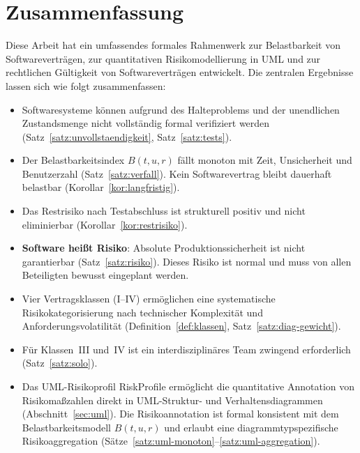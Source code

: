 ﻿\documentclass[a4paper,12pt]{article}
\theoremstyle{definition}
\begin{document}
\section{Zusammenfassung}

Diese Arbeit hat ein umfassendes formales Rahmenwerk zur Belastbarkeit von
Softwarevertr\"agen, zur quantitativen Risikomodellierung in UML und zur
rechtlichen G\"ultigkeit von Softwarevertr\"agen entwickelt. Die zentralen
Ergebnisse lassen sich wie folgt zusammenfassen:

\begin{itemize}
    \item Softwaresysteme k\"onnen aufgrund des Halteproblems und der unendlichen
          Zustandsmenge nicht vollst\"andig formal verifiziert werden
          (Satz~\ref{satz:unvollstaendigkeit}, Satz~\ref{satz:tests}).

    \item Der Belastbarkeitsindex $B(t,u,r)$ f\"allt monoton mit Zeit, Unsicherheit
          und Benutzerzahl (Satz~\ref{satz:verfall}). Kein Softwarevertrag bleibt
          dauerhaft belastbar (Korollar~\ref{kor:langfristig}).

    \item Das Restrisiko nach Testabschluss ist strukturell positiv und nicht
          eliminierbar (Korollar~\ref{kor:restrisiko}).

    \item \textbf{Software hei\ss{}t Risiko}: Absolute Produktionssicherheit ist
          nicht garantierbar (Satz~\ref{satz:risiko}). Dieses Risiko ist normal
          und muss von allen Beteiligten bewusst eingeplant werden.

    \item Vier Vertragsklassen (I--IV) erm\"oglichen eine systematische
          Risikokategorisierung nach technischer Komplexit\"at und
          Anforderungsvolatili\-t\"at (Definition~\ref{def:klassen},
          Satz~\ref{satz:diag-gewicht}).

    \item F\"ur Klassen~III und~IV ist ein interdisziplin\"ares Team zwingend
          erforderlich (Satz~\ref{satz:solo}).

    \item Das UML-Risikoprofil \textsf{RiskProfile} erm\"oglicht die quantitative
          Annotation von Risikoma\ss{}zahlen direkt in UML-Struktur- und
          Verhaltensdiagrammen (Abschnitt~\ref{sec:uml}). Die Risikoannotation ist
          formal konsistent mit dem Belastbarkeitsmodell $B(t,u,r)$ und erlaubt
          eine diagrammtypspezifische Risikoaggregation
          (S\"atze~\ref{satz:uml-monoton}--\ref{satz:uml-aggregation}).


\end{itemize}
\end{document}
